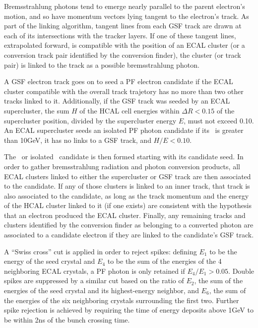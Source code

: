 Bremsstrahlung photons tend to emerge nearly parallel to the parent electron's motion, and so have momentum vectors lying tangent to the electron's track.
As part of the linking algorithm, tangent lines from each GSF track are drawn at each of its intersections with the tracker layers. If one of these tangent lines,
extrapolated forward, is compatible with the position of an ECAL cluster (or a conversion track pair identified by the conversion finder), the cluster (or track pair)
is linked to the track as a possible bremsstrahlung photon.

A GSF electron track goes on to seed a PF electron candidate if the ECAL cluster compatible with the overall track trajetory has no more than two other tracks linked to it.
Additionally, if the GSF track was seeded by an ECAL supercluster, the sum $H$ of the HCAL cell energies within $\Delta R < 0.15$ of the supercluster position,
divided by the supercluster energy $E$, must not exceed 0.10.
An ECAL supercluster seeds an isolated PF photon candidate if its \ET\ is greater than 10\unit{GeV}, it has no links to a GSF track, and $H/E < 0.10$.

The \Pe\ or isolated \Pgamma\ candidate is then formed starting with its candidate seed. In order to gather bremsstrahlung radiation and photon conversion products,
all ECAL clusters linked to either the supercluster or GSF track are then associated to the candidate.
If any of those clusters is linked to an inner track, that track is also associated to the candidate,
as long as the track momentum and the energy of the HCAL cluster linked to it (if one exists) are consistent with the hypothesis that an electron produced the ECAL cluster.
Finally, any remaining tracks and clusters identified by the conversion finder as belonging to a converted photon are associated to a candidate electron if they are linked
to the candidate's GSF track.

A ``Swiss cross'' cut is applied in order to reject spikes:
defining $E_{1}$ to be the energy of the seed crystal and $E_{4}$ to be the sum of the energies of the 4 neighboring ECAL crystals,
a PF photon is only retained if $E_{4}/E_{1} > 0.05$. Double spikes are suppressed by a similar cut based on the ratio of $E_{2}$, the sum of the energies
of the seed crystal and its highest-energy neighbor, and $E_{6}$, the sum of the energies of the six neighboring crystals surrounding the first
two. Further spike rejection is achieved by requiring the time of energy deposits above 1\unit{GeV} to be within 2\unit{ns} of the bunch crossing time.

